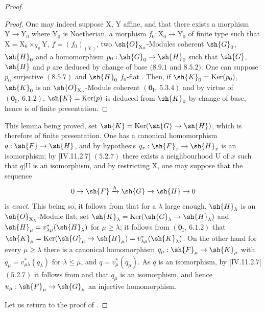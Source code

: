 \begin{proof}
\begin{proof}
One may indeed suppose $\mathrm{X}$, $\mathrm{Y}$ affine, and that there exists a morphism $\mathrm{Y}\to\mathrm{Y}_0$ where $\mathrm{Y}_0$ is Noetherian, a morphism $f_0:\mathrm{X}_0\to\mathrm{Y}_0$ of finite type such that $\mathrm{X}=\mathrm{X}_0\times_{\mathrm{Y}_0}\mathrm{Y}$, $f=(f_0)_{(\mathrm{Y})}$, two $\sh{O}_{\mathrm{X}_0}$-Modules coherent $\sh{G}_0$, $\sh{H}_0$ and a homomorphism $p_0:\sh{G}_0\to\sh{H}_0$ such that $\sh{G}$, $\sh{H}$ and $p$ are deduced by change of base $(8.9.1$ and $8.5.2)$. One can suppose $p_0$ surjective $(8.5.7)$ and $\sh{H}_0$ $f_0$-flat . Then, if $\sh{K}_0=\operatorname{Ker}(p_0)$, $\sh{K}_0$ is an $\sh{O}_{\mathrm{X}_0}$-Module coherent $(\mathbf{0}_\mathrm{I},~5.3.4)$ and by virtue of $(\mathbf{0}_\mathrm{I},~6.1.2)$, $\sh{K}=\operatorname{Ker}(p)$ is deduced from $\sh{K}_0$ by change of base, hence is of finite presentation.
\end{proof}

This lemma being proved, set $\sh{K}=\operatorname{Ker}(\sh{G}\to\sh{H})$, which is therefore of finite presentation. One has a canonical homomorphism $q:\sh{F}\to\sh{H}$, and by hypothesis $q_x:\sh{F}_x\to\sh{H}_x$ is an isomorphism; by [IV.11.2.7] $(5.2.7)$ there exists a neighbourhood $\mathrm{U}$ of $x$ such that $q|\mathrm{U}$ is an isomorphism, and by restricting $\mathrm{X}$, one may suppose that the sequence
\[
  0\to\sh{F}\xrightarrow{h}\sh{G}\to\sh{H}\to 0
\]
is \emph{exact}. This being so, it follows from  that for a $\lambda$ large enough, $\sh{H}_\lambda$ is an $\sh{O}_{\mathrm{X}_\lambda}$-Module flat; set $\sh{K}_\lambda=\operatorname{Ker}(\sh{G}_\lambda\to\sh{H}_\lambda)$ and $\sh{H}_\mu=v^*_{\lambda\mu}(\sh{H}_\lambda)$ for $\mu\geqslant\lambda$; it follows from $(\mathbf{0}_\mathrm{I},~6.1.2)$ that $\sh{K}_\mu=\operatorname{Ker}(\sh{G}_\mu\to\sh{H}_\mu)=v^*_{\lambda\mu}(\sh{K}_\lambda)$. On the other hand for every $\mu\geqslant\lambda$ there is a canonical homomorphism $q_\mu:\sh{F}_\mu\to\sh{K}_\mu$ with $q_\mu=v^*_{\mu\lambda}(q_\lambda)$ for $\lambda\leqslant\mu$, and $q=v^*_\mu(q_\mu)$. As $q$ is an isomorphism, by [IV.11.2.7] $(5.2.7)$ it follows from  and  that $q_\mu$ is an isomorphism, and hence $u_\mu:\sh{F}_\mu\to\sh{G}_\mu$ an injective homomorphism.

Let us return to the proof of .


\end{proof}
